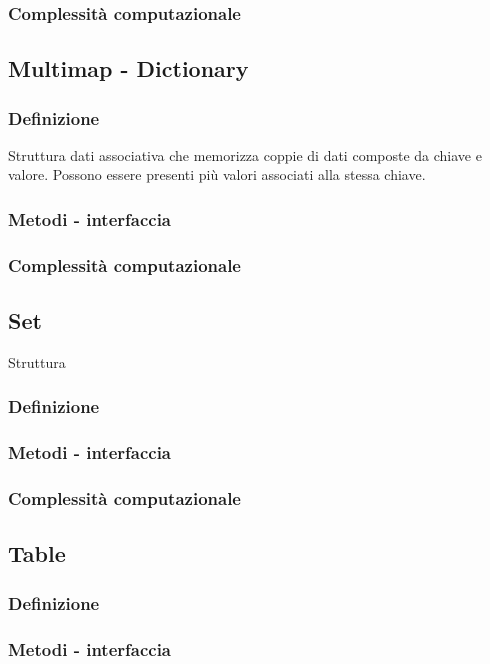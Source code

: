\documentclass{article}
\begin{document}
\subsubsection*{Complessità computazionale}

\subsection{Multimap - Dictionary}
\subsubsection*{Definizione}
Struttura dati associativa che memorizza coppie di dati composte da chiave e valore.
Possono essere presenti più valori associati alla stessa chiave.

\subsubsection*{Metodi - interfaccia}
\subsubsection*{Complessità computazionale}

\subsection{Set}
Struttura 
\subsubsection*{Definizione}
\subsubsection*{Metodi - interfaccia}
\subsubsection*{Complessità computazionale}

\subsection{Table}
\subsubsection*{Definizione}
\subsubsection*{Metodi - interfaccia}
\end{document}
